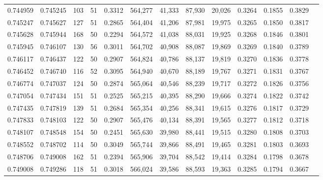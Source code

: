 \begin{tabular}{rrrrrrrrrrrrr}
0.744959 & 0.745245 &   103 &  51 &                                     0.3312 & 564,277 &  41,333 &  87,930 &  20,026 & 0.3264 & 0.1855 & 0.3829 \\
0.745247 & 0.745627 &   127 &  51 &                                     0.2865 & 564,404 &  41,206 &  87,981 &  19,975 & 0.3265 & 0.1850 & 0.3817 \\
0.745628 & 0.745944 &   168 &  50 &                                     0.2294 & 564,572 &  41,038 &  88,031 &  19,925 & 0.3268 & 0.1846 & 0.3801 \\
0.745945 & 0.746107 &   130 &  56 &                                     0.3011 & 564,702 &  40,908 &  88,087 &  19,869 & 0.3269 & 0.1840 & 0.3789 \\
0.746117 & 0.746437 &   122 &  50 &                                     0.2907 & 564,824 &  40,786 &  88,137 &  19,819 & 0.3270 & 0.1836 & 0.3778 \\
0.746452 & 0.746740 &   116 &  52 &                                     0.3095 & 564,940 &  40,670 &  88,189 &  19,767 & 0.3271 & 0.1831 & 0.3767 \\
0.746774 & 0.747037 &   124 &  50 &                                     0.2874 & 565,064 &  40,546 &  88,239 &  19,717 & 0.3272 & 0.1826 & 0.3756 \\
0.747054 & 0.747434 &   151 &  51 &                                     0.2525 & 565,215 &  40,395 &  88,290 &  19,666 & 0.3274 & 0.1822 & 0.3742 \\
0.747435 & 0.747819 &   139 &  51 &                                     0.2684 & 565,354 &  40,256 &  88,341 &  19,615 & 0.3276 & 0.1817 & 0.3729 \\
0.747833 & 0.748103 &   122 &  50 &                                     0.2907 & 565,476 &  40,134 &  88,391 &  19,565 & 0.3277 & 0.1812 & 0.3718 \\
0.748107 & 0.748548 &   154 &  50 &                                     0.2451 & 565,630 &  39,980 &  88,441 &  19,515 & 0.3280 & 0.1808 & 0.3703 \\
0.748552 & 0.748702 &   114 &  50 &                                     0.3049 & 565,744 &  39,866 &  88,491 &  19,465 & 0.3281 & 0.1803 & 0.3693 \\
0.748706 & 0.749008 &   162 &  51 &                                     0.2394 & 565,906 &  39,704 &  88,542 &  19,414 & 0.3284 & 0.1798 & 0.3678 \\
0.749008 & 0.749286 &   118 &  51 &                                     0.3018 & 566,024 &  39,586 &  88,593 &  19,363 & 0.3285 & 0.1794 & 0.3667 \\

\end{tabular}
